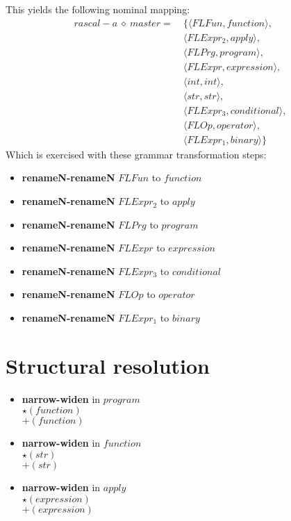 This yields the following nominal mapping:
\begin{align*}\mathit{rascal-a} \:\diamond\: \mathit{master} =\:& \{\langle \mathit{FLFun},\mathit{function}\rangle,\\
 & \langle \mathit{FLExpr_2},\mathit{apply}\rangle,\\
 & \langle \mathit{FLPrg},\mathit{program}\rangle,\\
 & \langle \mathit{FLExpr},\mathit{expression}\rangle,\\
 & \langle int,int\rangle,\\
 & \langle str,str\rangle,\\
 & \langle \mathit{FLExpr_3},\mathit{conditional}\rangle,\\
 & \langle \mathit{FLOp},\mathit{operator}\rangle,\\
 & \langle \mathit{FLExpr_1},\mathit{binary}\rangle\}\end{align*}
 Which is exercised with these grammar transformation steps:

{\footnotesize\begin{itemize}
\item \textbf{renameN-renameN} $\mathit{FLFun}$ to $\mathit{function}$
\item \textbf{renameN-renameN} $\mathit{FLExpr_2}$ to $\mathit{apply}$
\item \textbf{renameN-renameN} $\mathit{FLPrg}$ to $\mathit{program}$
\item \textbf{renameN-renameN} $\mathit{FLExpr}$ to $\mathit{expression}$
\item \textbf{renameN-renameN} $\mathit{FLExpr_3}$ to $\mathit{conditional}$
\item \textbf{renameN-renameN} $\mathit{FLOp}$ to $\mathit{operator}$
\item \textbf{renameN-renameN} $\mathit{FLExpr_1}$ to $\mathit{binary}$
\end{itemize}}

\section{Structural resolution}
{\footnotesize\begin{itemize}
\item \textbf{narrow-widen}  in $\mathit{program}$\\$\star \left(\mathit{function}\right)$\\$\plus \left(\mathit{function}\right)$
\item \textbf{narrow-widen}  in $\mathit{function}$\\$\star \left(str\right)$\\$\plus \left(str\right)$
\item \textbf{narrow-widen}  in $\mathit{apply}$\\$\star \left(\mathit{expression}\right)$\\$\plus \left(\mathit{expression}\right)$
\end{itemize}}
